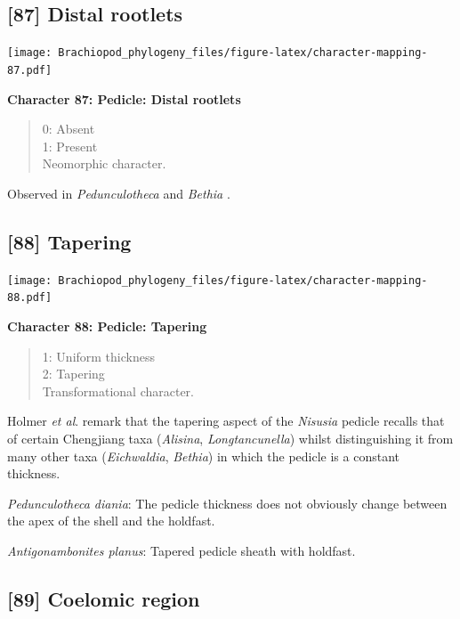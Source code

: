\documentclass[openany]{book}
\theoremstyle{definition}
\theoremstyle{definition}
\theoremstyle{definition}
\theoremstyle{remark}
\begin{document}
\hypertarget{distal-rootlets}{%
\subsection*{{[}87{]} Distal rootlets}\label{distal-rootlets}}

\texttt{[image: Brachiopod\_phylogeny\_files/figure-latex/character-mapping-87.pdf]}

\textbf{Character 87: Pedicle: Distal rootlets}

\begin{quote}
0: Absent\\
1: Present\\
Neomorphic character.
\end{quote}

Observed in \emph{Pedunculotheca} and \emph{Bethia}
\citep{Sutton2005Silurianbrachiopods}.

\hypertarget{tapering}{%
\subsection*{{[}88{]} Tapering}\label{tapering}}

\texttt{[image: Brachiopod\_phylogeny\_files/figure-latex/character-mapping-88.pdf]}

\textbf{Character 88: Pedicle: Tapering}

\begin{quote}
1: Uniform thickness\\
2: Tapering\\
Transformational character.
\end{quote}

Holmer \emph{et al}. \citeyearpar{Holmer2018Theattachment} remark that
the tapering aspect of the \emph{Nisusia} pedicle recalls that of
certain Chengjiang taxa (\emph{Alisina}, \emph{Longtancunella}) whilst
distinguishing it from many other taxa (\emph{Eichwaldia},
\emph{Bethia}) in which the pedicle is a constant thickness.

\emph{Pedunculotheca diania}: The pedicle thickness does not obviously
change between the apex of the shell and the holdfast.

\emph{Antigonambonites planus}: Tapered pedicle sheath with holdfast.

\hypertarget{coelomic-region}{%
\subsection*{{[}89{]} Coelomic region}\label{coelomic-region}}
\end{document}

